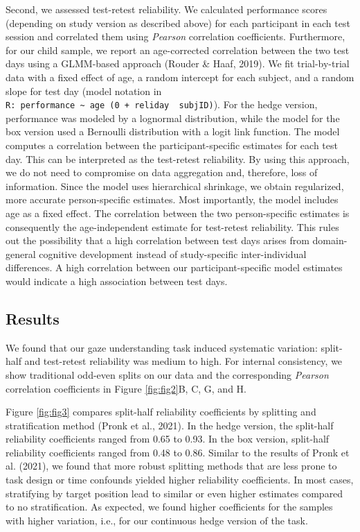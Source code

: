 \documentclass[
  man,floatsintext]{apa6}
\begin{document}
Second, we assessed test-retest reliability.
We calculated performance scores (depending on study version as described above) for each participant in each test session and correlated them using \emph{Pearson} correlation coefficients.
Furthermore, for our child sample, we report an age-corrected correlation between the two test days using a GLMM-based approach (Rouder \& Haaf, 2019).
We fit trial-by-trial data with a fixed effect of age, a random intercept for each subject, and a random slope for test day (model notation in \texttt{R:\ performance\ \textasciitilde{}\ age\ (0\ +\ reliday\ \textbar{}\ subjID)}).
For the hedge version, performance was modeled by a lognormal distribution, while the model for the box version used a Bernoulli distribution with a logit link function.
The model computes a correlation between the participant-specific estimates for each test day.
This can be interpreted as the test-retest reliability.
By using this approach, we do not need to compromise on data aggregation and, therefore, loss of information.
Since the model uses hierarchical shrinkage, we obtain regularized, more accurate person-specific estimates.
Most importantly, the model includes age as a fixed effect.
The correlation between the two person-specific estimates is consequently the age-independent estimate for test-retest reliability.
This rules out the possibility that a high correlation between test days arises from domain-general cognitive development instead of study-specific inter-individual differences.
A high correlation between our participant-specific model estimates would indicate a high association between test days.

\hypertarget{results-1}{%
\subsection{Results}\label{results-1}}

We found that our gaze understanding task induced systematic variation: split-half and test-retest reliability was medium to high.
For internal consistency, we show traditional odd-even splits on our data and the corresponding \emph{Pearson} correlation coefficients in Figure \ref{fig:fig2}B, C, G, and H.

Figure \ref{fig:fig3} compares split-half reliability coefficients by splitting and stratification method (Pronk et al., 2021).
In the hedge version, the split-half reliability coefficients ranged from 0.65 to 0.93.
In the box version, split-half reliability coefficients ranged from 0.48 to 0.86.
Similar to the results of Pronk et al. (2021), we found that more robust splitting methods that are less prone to task design or time confounds yielded higher reliability coefficients.
In most cases, stratifying by target position lead to similar or even higher estimates compared to no stratification.
As expected, we found higher coefficients for the samples with higher variation, i.e., for our continuous hedge version of the task.
\end{document}
